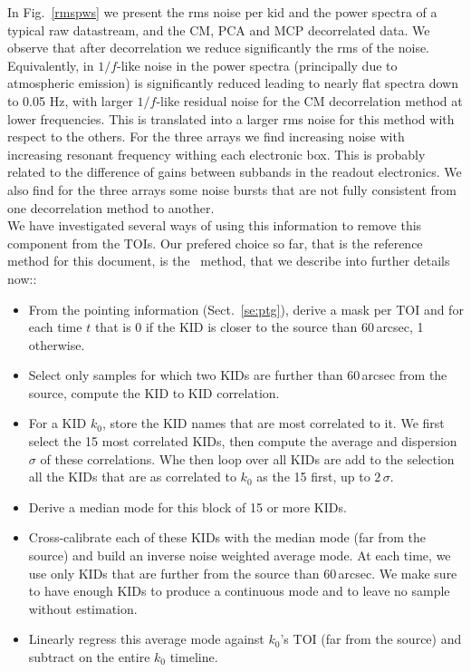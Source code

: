 In Fig.~\ref{rmspws} we present the rms noise per kid and the power spectra of
a typical raw datastream, and the CM, PCA and MCP decorrelated data. We observe that after
decorrelation we reduce significantly the rms of the noise. Equivalently, in
$1/f$-like noise in the power spectra (principally due to atmospheric emission)
is significantly reduced leading to nearly flat spectra down to 0.05 Hz, with
larger $1/f$-like residual noise for the CM decorrelation method at lower
frequencies. This is translated into a larger rms noise for this method with
respect to the others. For the three arrays we find increasing noise with
increasing resonant frequency withing each electronic box. This is probably
related to the difference of gains between subbands in the readout
electronics. We also find for the three arrays some noise bursts that are not
fully consistent from one decorrelation method to another. \\

We have investigated several ways of using this information to remove this
component from the TOIs. Our prefered choice so far, that is the reference
method for this document, is the \cmoneb\ method, that we describe into further
details now::

\begin{itemize}
\item From the pointing information (Sect.~\ref{se:ptg}), derive a mask per TOI
  and for each time $t$ that is 0 if the KID is closer to the source than 60\,arcsec, 1
  otherwise.
\item Select only samples for which two KIDs are further than 60\,arcsec from the source, compute
  the KID to KID correlation.
\item For a KID $k_0$, store the KID names that are most
  correlated to it. We first select the 15 most correlated KIDs, then compute
  the average and dispersion $\sigma$ of these correlations. Whe then loop over all KIDs
  are add to the selection all the KIDs that are as correlated to $k_0$ as the
  15 first, up to $2\,\sigma$.
\item Derive a median mode for this block of 15 or more KIDs.
\item Cross-calibrate each of these KIDs with the median mode (far from the
  source) and build an inverse noise weighted average mode. At each time, we use
  only KIDs that are further from the source than 60\,arcsec. We make sure to
  have enough KIDs to produce a continuous mode and to leave no sample without
  estimation.
\item Linearly regress this average mode against $k_0$'s TOI (far from the
  source) and subtract on the entire $k_0$ timeline.
\end{itemize}

